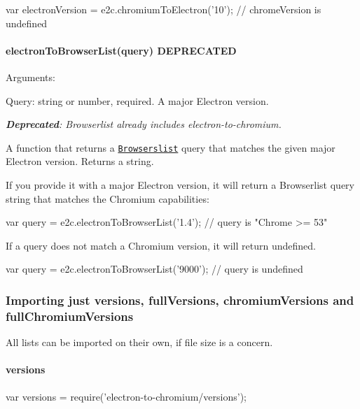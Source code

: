 \begin{DoxyCode}
var electronVersion = e2c.chromiumToElectron('10');
// chromeVersion is undefined
\end{DoxyCode}


\paragraph*{{\ttfamily electron\+To\+Browser\+List(query)} {\bfseries D\+E\+P\+R\+E\+C\+A\+T\+ED}}

Arguments\+:
\begin{DoxyItemize}
\item Query\+: string or number, required. A major Electron version.
\end{DoxyItemize}

{\itshape {\bfseries Deprecated}\+: Browserlist already includes electron-\/to-\/chromium.}

A function that returns a \href{https://github.com/ai/browserslist}{\tt Browserslist} query that matches the given major Electron version. Returns a string.

If you provide it with a major Electron version, it will return a Browserlist query string that matches the Chromium capabilities\+:


\begin{DoxyCode}
var query = e2c.electronToBrowserList('1.4');
// query is "Chrome >= 53"
\end{DoxyCode}


If a query does not match a Chromium version, it will return {\ttfamily undefined}.


\begin{DoxyCode}
var query = e2c.electronToBrowserList('9000');
// query is undefined
\end{DoxyCode}


\subsubsection*{Importing just versions, full\+Versions, chromium\+Versions and full\+Chromium\+Versions}

All lists can be imported on their own, if file size is a concern.

\paragraph*{{\ttfamily versions}}


\begin{DoxyCode}
var versions = require('electron-to-chromium/versions');
\end{DoxyCode}


